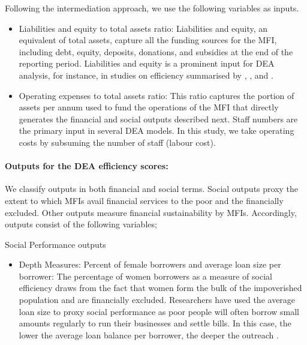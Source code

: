 \documentclass[a4paper, nobind]{templates/ociamthesis}
\providecommand{\tightlist}{%
  \setlength{\itemsep}{0pt}\setlength{\parskip}{0pt}}
\begin{document}
Following the intermediation approach, we use the following variables as inputs.

\begin{itemize}
\item
  Liabilities and equity to total assets ratio: Liabilities and equity, an equivalent of total assets, capture all the funding sources for the MFI, including debt, equity, deposits, donations, and subsidies at the end of the reporting period. Liabilities and equity is a prominent input for DEA analysis, for instance, in studies on efficiency summarised by \textcite{fethi2010assessing}, \textcite{paradi2017data}, and \textcite{fall2018dea}.
\item
  Operating expenses to total assets ratio: This ratio captures the portion of assets per annum used to fund the operations of the MFI that directly generates the financial and social outputs described next. Staff numbers are the primary input in several DEA models. In this study, we take operating costs by subsuming the number of staff (labour cost).
\end{itemize}

\hypertarget{outputs-for-the-dea-efficiency-scores}{%
\paragraph{Outputs for the DEA efficiency scores:}\label{outputs-for-the-dea-efficiency-scores}}

We classify outputs in both financial and social terms. Social outputs proxy the extent to which MFIs avail financial services to the poor and the financially excluded. Other outputs measure financial sustainability by MFIs. Accordingly, outputs consist of the following variables;

\vspace{5mm}

Social Performance outputs
\vspace{2mm}

\begin{itemize}
\tightlist
\item
  Depth Measures: Percent of female borrowers and average loan size per borrower: The percentage of women borrowers as a measure of social efficiency draws from the fact that women form the bulk of the impoverished population and are financially excluded. Researchers have used the average loan size to proxy social performance as poor people will often borrow small amounts regularly to run their businesses and settle bills. In this case, the lower the average loan balance per borrower, the deeper the outreach \autocite{d2017ngos}.
\end{itemize}
\end{document}
